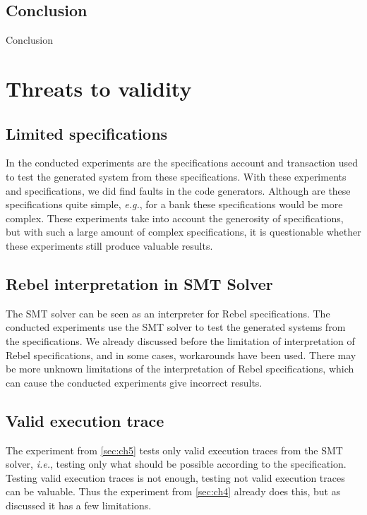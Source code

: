 \subsection{Conclusion}
Conclusion

\section{Threats to validity}

\subsection*{Limited specifications}
In the conducted experiments are the specifications account and transaction used
to test the generated system from these specifications. With these experiments
and specifications, we did find faults in the code generators. Although are
these specifications quite simple, \textit{e.g.}, for a bank these
specifications would be more complex. These experiments take into account the
generosity of specifications, but with such a large amount of complex
specifications, it is questionable whether these experiments still produce
valuable results.

\subsection*{Rebel interpretation in SMT Solver}
The SMT solver can be seen as an interpreter for Rebel specifications. The
conducted experiments use the SMT solver to test the generated systems from the
specifications. We already discussed before the limitation of interpretation of
Rebel specifications, and in some cases, workarounds have been used. There may
be more unknown limitations of the interpretation of Rebel specifications, which
can cause the conducted experiments give incorrect results.

\subsection*{Valid execution trace}
The experiment from \autoref{sec:ch5} tests only valid execution traces from
the SMT solver, \textit{i.e.}, testing only what should be possible according to
the specification. Testing valid execution traces is not enough, testing not
valid execution traces can be valuable. Thus the experiment from
\autoref{sec:ch4} already does this, but as discussed it has a few limitations.
